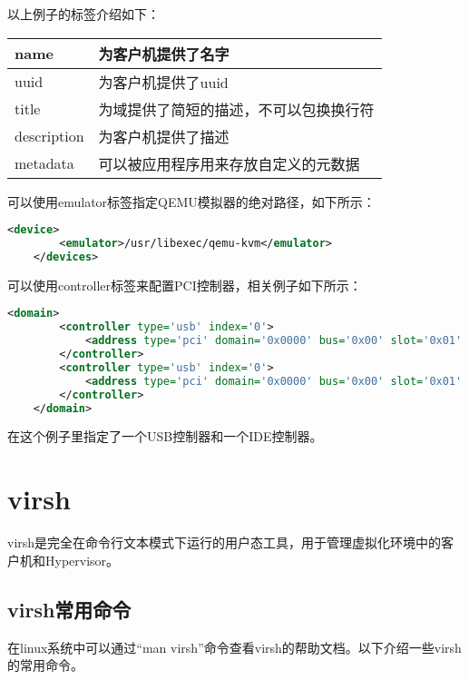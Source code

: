 \documentclass[a4paper,left=2.5cm,right=2.5cm,11pt]{article}
\newcommand{\interval}{\vspace{0.5em}}
\begin{document}
	以上例子的标签介绍如下：
	\interval
	\begin{longtable}{p{1.5cm}p{10cm}}
	\hline
	name & 为客户机提供了名字 \\
	\hline
	uuid & 为客户机提供了uuid \\
	\hline
	title & 为域提供了简短的描述，不可以包换换行符 \\
	\hline
	description & 为客户机提供了描述 \\
	\hline
	metadata & 可以被应用程序用来存放自定义的元数据 \\
	\hline
	\end{longtable}

	可以使用emulator标签指定QEMU模拟器的绝对路径，如下所示：
	\begin{lstlisting}[language = XML]
	<device>
		<emulator>/usr/libexec/qemu-kvm</emulator>
	</devices>
	\end{lstlisting}

	可以使用controller标签来配置PCI控制器，相关例子如下所示：
	\begin{lstlisting}[language = XML]
	<domain>
		<controller type='usb' index='0'>
			<address type='pci' domain='0x0000' bus='0x00' slot='0x01' function='0x2'/>
		</controller>
		<controller type='usb' index='0'>
			<address type='pci' domain='0x0000' bus='0x00' slot='0x01' function='0x1'/>
		</controller>
	</domain>
	\end{lstlisting}

	在这个例子里指定了一个USB控制器和一个IDE控制器。

\clearpage

\section{virsh}
	virsh是完全在命令行文本模式下运行的用户态工具，用于管理虚拟化环境中的客户机和Hypervisor。

\subsection{virsh常用命令}
	在linux系统中可以通过“man virsh”命令查看virsh的帮助文档。以下介绍一些virsh的常用命令。
\end{document}
